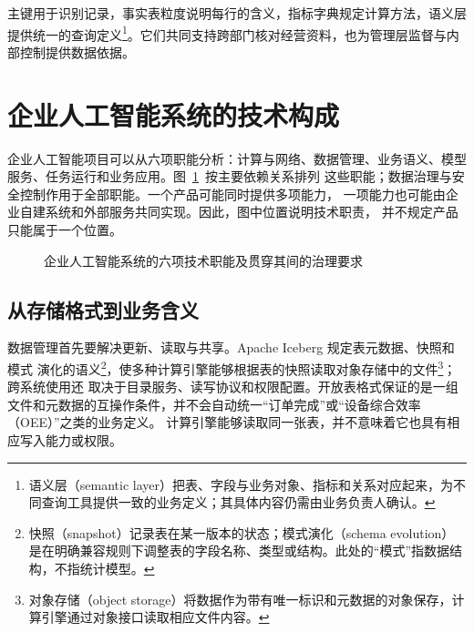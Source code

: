 主键用于识别记录，事实表粒度说明每行的含义，指标字典规定计算方法，语义层提供统一的查询定义\footnote{语义层（semantic layer）把表、字段与业务对象、指标和关系对应起来，为不同查询工具提供一致的业务定义；其具体内容仍需由业务负责人确认。}。它们共同支持跨部门核对经营资料，也为管理层监督与内部控制提供数据依据。

\section{企业人工智能系统的技术构成}
\label{sec:enterprise-ai-stack}

企业人工智能项目可以从六项职能分析：计算与网络、数据管理、业务语义、模型
服务、任务运行和业务应用。图~\ref{fig:enterprise-ai-stack}~按主要依赖关系排列
这些职能；数据治理与安全控制作用于全部职能。一个产品可能同时提供多项能力，
一项能力也可能由企业自建系统和外部服务共同实现。因此，图中位置说明技术职责，
并不规定产品只能属于一个位置。

\begin{figure}[htbp]
\centering
{}
\caption{企业人工智能系统的六项技术职能及贯穿其间的治理要求}
\label{fig:enterprise-ai-stack}
\end{figure}

\subsection{从存储格式到业务含义}
数据管理首先要解决更新、读取与共享。Apache Iceberg 规定表元数据、快照和模式
演化的语义\footnote{快照（snapshot）记录表在某一版本的状态；模式演化（schema evolution）是在明确兼容规则下调整表的字段名称、类型或结构。此处的“模式”指数据结构，不指统计模型。}，使多种计算引擎能够根据表的快照读取对象存储中的文件\footnote{对象存储（object storage）将数据作为带有唯一标识和元数据的对象保存，计算引擎通过对象接口读取相应文件内容。}；跨系统使用还
取决于目录服务、读写协议和权限配置\cite{iceberg2026}。开放表格式保证的是一组
文件和元数据的互操作条件，并不会自动统一“订单完成”或“设备综合效率（OEE）”之类的业务定义。
计算引擎能够读取同一张表，并不意味着它也具有相应写入能力或权限。

